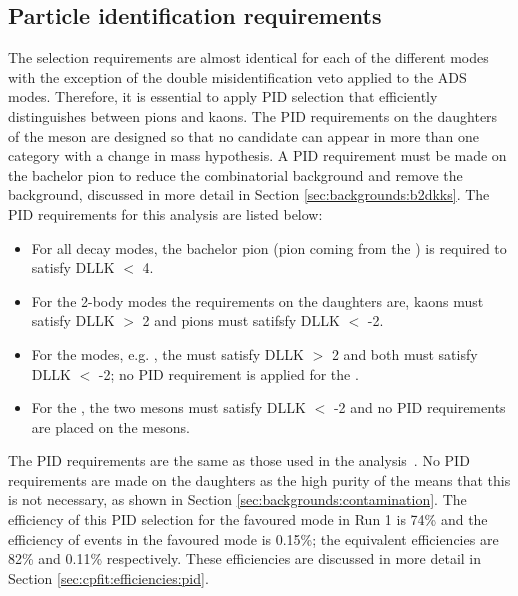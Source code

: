 \subsection{Particle identification requirements}
\label{sec:selection:pid}

The selection requirements are almost identical for each of the different \Dz modes with the exception of the double misidentification veto applied to the ADS modes. Therefore, it is essential to apply PID selection that efficiently distinguishes between pions and kaons. The PID requirements on the daughters of the \Dz meson are designed so that no  candidate can appear in more than one category with a change in mass hypothesis. A PID requirement must be made on the bachelor pion to reduce the combinatorial background and remove the \decay{\Bm}{\D\KS\Km} background, discussed in more detail in Section \ref{sec:backgrounds:b2dkks}. The PID requirements for this analysis are listed below:
\begin{itemize}
\item For all \Dz decay modes, the bachelor pion (pion coming from the \Kstarm) is required to satisfy DLLK $<$ 4.
\item For the 2-body \Dz modes the requirements on the \Dz daughters are, kaons must satisfy DLLK $>$ 2 and pions must satifsfy DLLK $<$ -2. 
\item For the  modes, e.g. \decay{\Dz}{\Km\pip\pim\pip}, the \Km must satisfy DLLK $>$ 2 and both \pip must satisfy DLLK $<$ -2; no PID requirement is applied for the \pim.
\item For the \decay{\Dz}{\pip\pim\pip\pim}, the two \pip mesons must satisfy DLLK $<$ -2 and no PID requirements are placed on the \pim mesons.
\end{itemize}
The PID requirements are the same as those used in the \decay{\Bp}{\D\Kp} analysis~\cite{LHCb-PAPER-2016-003}. No PID requirements are made on the \KS daughters as the high purity of the \KS means that this is not necessary, as shown in Section \ref{sec:backgrounds:contamination}. The efficiency of this PID selection for the \kpi favoured mode in Run 1 is 74\% and the efficiency of \pik events in the favoured mode is 0.15\%; the equivalent \runtwo efficiencies are 82\% and 0.11\% respectively. These efficiencies are discussed in more detail in Section \ref{sec:cpfit:efficiencies:pid}. 


